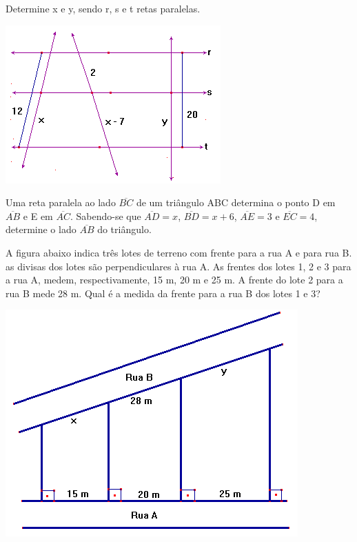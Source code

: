 	\item Determine x e y, sendo r, s e t retas  paralelas.
	\begin{center}
	\includegraphics[scale=0.7]{figuras/fig57.png}
	\end{center}
	
	\item Uma reta paralela ao lado $\overline{BC}$ de um triângulo ABC determina o ponto D em $\overline{AB}$ e E em $\overline{AC}$. Sabendo-se que $\overline{AD}= x$, $\overline{BD} = x + 6$,  $\overline{AE} = 3$ e $\overline{EC} = 4$, determine o lado $\overline{AB}$ do triângulo.
	
	\item A figura abaixo indica três lotes de terreno com frente para a rua A e para rua B. as divisas dos lotes são perpendiculares à rua A. As frentes dos lotes 1, 2 e 3 para a rua A, medem, respectivamente, 15 m, 20 m e 25 m. A frente do lote 2 para a rua B mede 28 m. Qual é a medida da frente para a rua B dos lotes 1 e 3?
	\begin{center}
	\includegraphics[scale=0.7]{figuras/fig58.png}
	\end{center}
	
